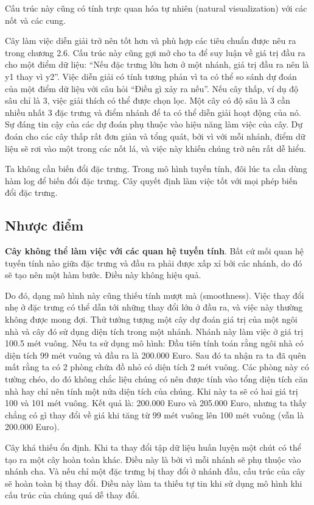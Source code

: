 Cấu trúc này cũng có tính trực quan hóa tự nhiên (natural visualization) với các nốt và các cung.

Cây làm việc diễn giải trở nên tốt hơn và phù hợp các tiêu chuẩn được nêu ra trong chương 2.6. Cấu trúc này cũng gợi mở cho ta để suy luận về giá trị đầu ra cho một điểm dữ liệu: ``Nếu đặc trưng lớn hơn ở một nhánh, giá trị đầu ra nên là y1 thay vì y2''. Việc diễn giải có tính tương phản vì ta có thể so sánh dự đoán của một điểm dữ liệu với câu hỏi ``Điều gì xảy ra nếu''. Nếu cây thấp, ví dụ độ sâu chỉ là 3, việc giải thích có thể được chọn lọc. Một cây có độ sâu là 3 cần nhiều nhất 3 đặc trưng và điểm nhánh để ta có thể diễn giải hoạt động của nó. Sự đáng tin cậy của các dự đoán phụ thuộc vào hiệu năng làm việc của cây. Dự đoán cho các cây thấp rất đơn giản và tổng quát, bởi vì với mỗi nhánh, điểm dữ liệu sẽ rơi vào một trong các nốt lá, và việc này khiến chúng trở nên rất dễ hiểu.

Ta không cần biến đổi đặc trưng. Trong mô hình tuyến tính, đôi lúc ta cần dùng hàm log để biến đổi đặc trưng. Cây quyết định làm việc tốt với mọi phép biến đổi đặc trưng.

\subsection{Nhược điểm}

\textbf{Cây không thể làm việc với các quan hệ tuyến tính}. Bất cứ mối quan hệ tuyến tính nào giữa đặc trưng và đầu ra phải được xấp xỉ bởi các nhánh, do đó sẽ tạo nên một hàm bước. Điều này không hiệu quả.

Do đó, dạng mô hình này cũng thiếu tính mượt mà (smoothness). Việc thay đổi nhẹ ở đặc trưng có thể dẫn tới những thay đổi lớn ở đầu ra, và việc này thường không được mong đợi. Thử tưởng tượng một cây dự đoán giá trị của một ngôi nhà và cây đó sử dụng diện tích trong một nhánh. Nhánh này làm việc ở giá trị 100.5 mét vuông. Nếu ta sử dụng mô hình: Đầu tiên tính toán rằng ngôi nhà có diện tích 99 mét vuông và đầu ra là 200.000 Euro. Sau đó ta nhận ra ta đã quên mất rằng ta có 2 phòng chứa đồ nhỏ có diện tích 2 mét vuông. Các phòng này có tường chéo, do đó không chắc liệu chúng có nên được tính vào tổng diện tích căn nhà hay chỉ nên tính một nửa diện tích của chúng. Khi này ta sẽ có hai giá trị 100 và 101 mét vuông. Kết quả là: 200.000 Euro và 205.000 Euro, nhưng ta thấy chẳng có gì thay đổi về giá khi tăng từ 99 mét vuông lên 100 mét vuông (vẫn là 200.000 Euro).

Cây khá thiếu ổn định. Khi ta thay đổi tập dữ liệu huấn luyện một chút có thể tạo ra một cây hoàn toàn khác. Điều này là bởi vì mỗi nhánh sẽ phụ thuộc vào nhánh cha. Và nếu chỉ một đặc trưng bị thay đổi ở nhánh đầu, cấu trúc của cây sẽ hoàn toàn bị thay đổi. Điều này làm ta thiếu tự tin khi sử dụng mô hình khi cấu trúc của chúng quá dễ thay đổi.

